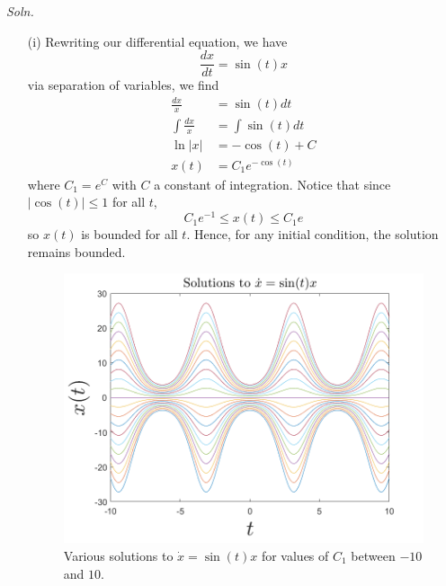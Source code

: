 \documentclass{article}
\begin{document}
\begin{itemize}
    \textit{Soln.}
    \begin{itemize}
        \item[(i)] Rewriting our differential equation, we have
        \[\frac{dx}{dt} = \sin(t)x\]
        via separation of variables, we find
        \begin{align*}
            \frac{dx}{x} &= \sin(t)dt\\
            \int\frac{dx}{x} &= \int\sin(t)dt\\
            \ln|x| &= -\cos(t) + C\\
            x(t) &= C_1e^{-\cos(t)}
        \end{align*}
        where $C_1 = e^C$ with $C$ a constant of integration. Notice that since $|\cos(t)| \leq 1$ for all $t$,
        \[C_1e^{-1} \leq x(t) \leq C_1e\]
        so $x(t)$ is bounded for all $t$. Hence, for any initial condition, the solution remains bounded.

        \begin{figure}[H]
            \includegraphics[scale = 0.5]{sin_t_x_de.png}
            \centering
            \caption{Various solutions to $\dot{x} = \sin(t)x$ for values of $C_1$ between $-10$ and $10$.}
        \end{figure}


\end{itemize}
\end{itemize}
\end{document}
